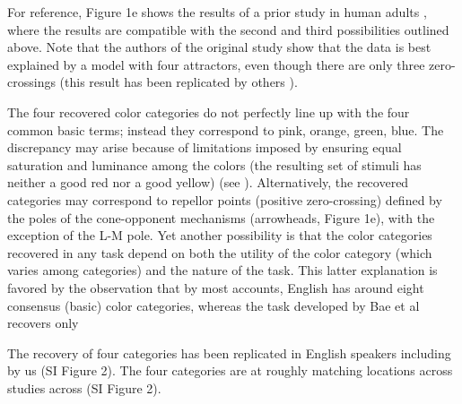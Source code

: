 \documentclass[9pt,biorxiv,lineno,onehalfspacing]{lapreprint}
\begin{document}
\begin{refsection}
For reference, Figure 1e shows the results of a prior study in human adults \citep{bae_why_2015}, where the results are compatible with the second and third possibilities outlined above. 
Note that the authors of the original study show that the data is best explained by a model with four attractors, even though there are only three zero-crossings (this result has been replicated by others \citep{panichello_error-correcting_2019}). 

The four recovered color categories do not perfectly line up with the four common basic terms; instead they correspond to pink, orange, green, blue.
The discrepancy may arise because of limitations imposed by ensuring equal saturation and luminance among the colors (the resulting set of stimuli has neither a good red nor a good yellow) (see \citep{bae_why_2015}). 
Alternatively, the  recovered categories may correspond to repellor points (positive zero-crossing) defined by the poles of the cone-opponent mechanisms (arrowheads, Figure 1e), with the exception of the L-M pole. Yet another possibility is that the color categories recovered in any task depend on both the utility of the color category (which varies among categories) and the nature of the task. This latter explanation is favored by the observation that by most accounts, English has around eight consensus (basic) color categories, whereas the task developed by Bae et al recovers only 

The recovery of four categories has been replicated in English speakers \citep{panichello_error-correcting_2019} including by us (SI Figure 2). The four categories are at roughly matching locations across studies across (SI Figure 2). 


\end{refsection}
\end{document}
